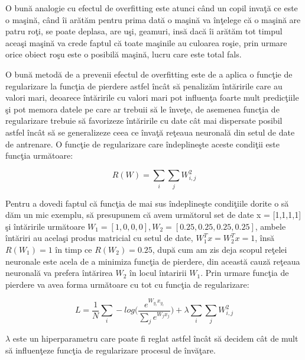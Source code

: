 \par 

O bun\u{a} analogie cu efectul de overfitting este atunci c\^{a}nd un copil inva\c{t}\u{a} ce este o ma\c{s}in\u{a}, c\^{a}nd \^{i}i ar\u{a}t\u{a}m pentru prima dat\u{a} o ma\c{s}in\u{a} va \^{i}n\c{t}elege c\u{a} o ma\c{s}in\u{a} are patru ro\c{t}i, se poate deplasa, are u\c{s}i, geamuri, ins\u{a} dac\u{a} \^{i}i ar\u{a}t\u{a}m tot timpul acea\c{s}i ma\c{s}in\u{a} va crede faptul c\u{a} toate ma\c{s}inile au culoarea ro\c{s}ie, prin urmare orice obiect ro\c{s}u este o posibil\u{a} ma\c{s}in\u{a}, lucru care este total fals.

\par

O bun\u{a} metod\u{a} de a prevenii efectul de overfitting este de a aplica o func\c{t}ie de regularizare la func\c{t}ia de pierdere astfel \^{i}nc\^{a}t s\u{a} penaliz\u{a}m \^{i}nt\u{a}ririle care au valori mari, deoarece \^{i}nt\u{a}ririle cu valori mari pot influen\c{t}a  foarte mult predic\c{t}iile \c{s}i pot memora datele pe care ar trebuii s\u{a} le \^{i}nve\c{t}e, de asemenea func\c{t}ia de regularizare trebuie s\u{a} favorizeze \^{i}nt\u{a}ririle cu date c\^{a}t mai dispersate posibil astfel \^{i}nc\^{a}t s\u{a} se generalizeze ceea ce \^{i}nva\c{t}\u{a} re\c{t}eaua neuronal\u{a} din setul de date de antrenare. O func\c{t}ie de regularizare care \^{i}ndepline\c{s}te aceste condi\c{t}ii este func\c{t}ia urm\u{a}toare:

$$ R(W) = \sum_i \sum_j W_{i,j}^2 $$

Pentru a dovedi faptul c\u{a} func\c{t}ia de mai sus \^{i}ndepline\c{s}te condi\c{t}iile dorite o s\u{a} d\u{a}m un mic exemplu, s\u{a} presupunem c\u{a} avem urm\u{a}torul set de date x = [1,1,1,1] \c{s}i \^{i}nt\u{a}ririle urm\u{a}toare $W_1 = [1,0,0,0], W_2 = [0.25, 0.25, 0.25, 0.25]$, ambele \^{i}nt\u{a}riri au acela\c{s}i produs matricial cu setul de date, $W^T_1 x = W^T_2 x = 1$, \^{i}ns\u{a} $R(W_1) = 1 $ \^{i}n timp ce $R(W_2) = 0.25$, dup\u{a} cum am zis deja scopul re\c{t}elei neuronale este acela de a minimiza func\c{t}ia de pierdere, din aceast\u{a} cauz\u{a} re\c{t}eaua neuronal\u{a} va prefera \^{i}nt\u{a}rirea $W_2$ \^{i}n locul \^{i}ntaririi $W_1$. Prin urmare func\c{t}ia de pierdere va avea forma urm\u{a}toare cu tot cu func\c{t}ia de regularizare:

$$L = \frac{1}{N} \sum_i - log \bigg(\frac{e^{W_y_i x_y_i}}{\sum_j e^{W_j x_j}}\bigg) + \lambda \sum_i \sum_j W_{i,j}^2 $$

$\lambda$ este un hiperparametru care poate fi reglat astfel \^{i}nc\^{a}t s\u{a} decidem c\^{a}t de mult s\u{a} influen\c{t}eze func\c{t}ia de regularizare procesul de \^{i}nv\u{a}\c{t}are.

